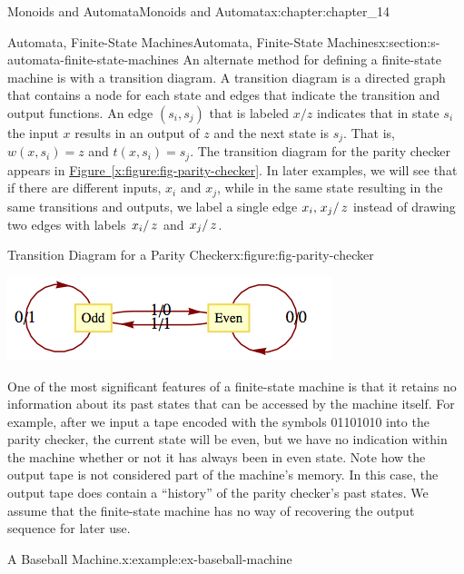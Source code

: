 \documentclass[oneside,10pt,]{book}
\newcommand{\xreffont}{\relax}
\numberwithin{equation}{section}
\begin{document}
\begin{chapterptx}{Monoids and Automata}{}{Monoids and Automata}{}{}{x:chapter:chapter_14}
\begin{sectionptx}{Automata, Finite-State Machines}{}{Automata, Finite-State Machines}{}{}{x:section:s-automata-finite-state-machines}
An alternate method for defining a finite-state machine is with a transition diagram. A transition diagram is a directed graph that contains a node for each state and edges that indicate the transition and output functions. An edge \(\left(s_i,s_j\right)\) that is labeled \(x/z\) indicates that in state \(s_i\) the input \(x\) results in an output of \(z\) and the next state is \(s_j\). That is, \(w\left(x, s_i\right)=z\) and \(t\left(x, s_i\right)=s_j\). The transition diagram for the parity checker appears in \hyperref[x:figure:fig-parity-checker]{Figure~{\xreffont\ref{x:figure:fig-parity-checker}}}. In later examples, we will see that if there are different inputs, \(x_i\) and \(x_j\), while in the same state resulting in the same transitions and outputs, we label a single edge \(x_i, \left.x_j\right/z\) instead of drawing two edges with labels \(\left.x_i\right/z\) and \(\left.x_j\right/z\).%
\begin{figureptx}{Transition Diagram for a Parity Checker}{x:figure:fig-parity-checker}{}%
\begin{image}{0.1}{0.8}{0.1}%
\includegraphics[width=\linewidth]{images/fig-parity-checker.png}
\end{image}%
\tcblower
\end{figureptx}%
One of the most significant features of a finite-state machine is that it retains no information about its past states that can be accessed by the machine itself. For example, after we input a tape encoded with the symbols 01101010 into the parity checker, the current state will be even, but we have no indication within the machine whether or not it has always been in even state. Note how the output tape is not considered part of the machine's memory. In this case, the output tape does contain a ``history'' of the parity checker's past states. We  assume that the finite-state machine has no way of recovering the output sequence for later use.%
\begin{example}{A Baseball Machine.}{x:example:ex-baseball-machine}%

\end{example}
\end{sectionptx}
\end{chapterptx}
\end{document}
